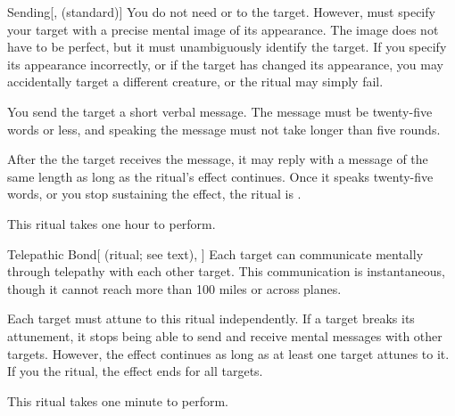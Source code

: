 \lowercase{\hypertarget{spell:Sending}{}}\label{spell:Sending}
\begin{apability}[\nth{3}]{\hypertarget{spell:Sending}{Sending}}[,  (standard)]
You do not need  or  to the target.
However,  must specify your target with a precise mental image of its appearance.
The image does not have to be perfect, but it must unambiguously identify the target.
If you specify its appearance incorrectly, or if the target has changed its appearance, you may accidentally target a different creature, or the ritual may simply fail.

You send the target a short verbal message.
The message must be twenty-five words or less, and speaking the message must not take longer than five rounds.

After the the target receives the message, it may reply with a message of the same length as long as the ritual's effect continues.
Once it speaks twenty-five words, or you stop sustaining the effect, the ritual is .

This ritual takes one hour to perform.
\end{apability}
\vspace{0.25em}



\lowercase{\hypertarget{spell:Telepathic Bond}{}}\label{spell:Telepathic Bond}
\begin{attuneability}[\nth{3}]{\hypertarget{spell:Telepathic Bond}{Telepathic Bond}}[ (ritual; see text), ]
Each target can communicate mentally through telepathy with each other target.
This communication is instantaneous, though it cannot reach more than 100 miles or across planes.

Each target must attune to this ritual independently.
If a target breaks its attunement, it stops being able to send and receive mental messages with other targets.
However, the effect continues as long as at least one target attunes to it.
If you  the ritual, the effect ends for all targets.

This ritual takes one minute to perform.
\end{attuneability}
\vspace{0.25em}




